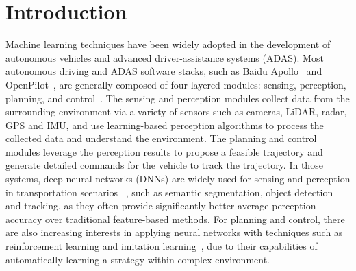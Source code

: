 \documentclass[letterpaper, 10 pt, conference]{ieeeconf}
\begin{document}
\section{Introduction}
Machine learning techniques have been widely adopted in the development of autonomous vehicles and advanced driver-assistance systems (ADAS). 
Most autonomous driving and ADAS software stacks, such as Baidu Apollo~\cite{baiduapollo} and OpenPilot~\cite{openpilot}, are generally composed of four-layered modules: sensing, perception, planning, and control~\cite{yurtsever2020survey}. The sensing and perception modules collect data from the surrounding environment via a variety of sensors such as cameras, LiDAR, radar, GPS and IMU, and use learning-based perception algorithms to process the collected data and understand the environment. The planning and control modules leverage the perception results to propose a feasible trajectory and generate detailed commands for the vehicle to track the trajectory. In those systems, deep neural networks (DNNs) are widely used for sensing and perception in transportation scenarios~\cite{gao2018object,xu2020data,siam2017deep}
, such as semantic segmentation, object detection and tracking, as they often provide significantly better average perception accuracy over traditional feature-based methods. For planning and control, there are also increasing interests in applying neural networks with techniques such as reinforcement learning and imitation learning~\cite{rhinehart2018deep}, due to their capabilities of automatically learning a strategy within complex environment. 
\end{document}
